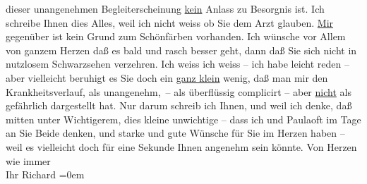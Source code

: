 \begin{ledgroupsized}[t]{13cm}
               dieser unangenehmen Begleiterscheinung \uline{kein} Anlass zu
               Besorgnis ist. Ich schreibe Ihnen dies Alles, weil ich {\pb}nicht weiss ob Sie dem Arzt glauben. \uline{Mir} gegenüber ist kein Grund zum Schönfärben
               vorhanden. Ich wünsche vor Allem von ganzem Herzen daß es bald und rasch {\pb}besser geht, dann daß Sie sich
               nicht in nutzlosem Schwarzsehen  verzehren. Ich
               weiss ich weiss – ich habe leicht reden – aber vielleicht beruhigt es Sie doch ein
                  \uline{ganz klein} wenig, daß man mir den
               Krankheitsverlauf, als unangenehm, – als überflüssig complicirt – aber \uline{nicht} als gefährlich dargestellt hat.\pend
           \pstart
           {\pb}Nur darum schreib ich Ihnen, und
               weil ich denke, daß mitten unter Wichtigerem, dies kleine unwichtige – dass ich und
                  Paulaoft im Tage an Sie Beide denken,
               und starke und gute Wünsche für Sie im Herzen haben – weil es vielleicht doch für
               eine Sekunde Ihnen angenehm sein könnte.\pend
           \pstart
           Von Herzen wie immer{\\[\baselineskip]}Ihr \spacefill\mbox{Richard}\pend
           \leftskip=0em{}\endnumbering{}\end{ledgroupsized}  \newcommand{\dateiname}{L01739}\newcommand{\titel}{Richard Beer-Hofmann an Arthur Schnitzler, [11. 12. 1907]}\newcommand{\editorInnen}{Martin Anton Müller und Gerd-Hermann Susen}
      